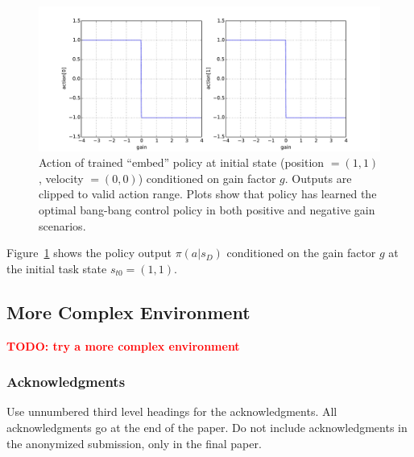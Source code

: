 \documentclass{article}
\newcommand{\TODO}[1]{\textcolor{red}{\textbf{TODO: #1}}}
\begin{document}
\begin{figure}
\centering
\includegraphics[width=\textwidth]{pointmass_conditional_action.pdf}
\caption{
Action of trained ``embed'' policy at initial state (position $ = (1,1)$, velocity $=(0,0)$) conditioned on gain factor $g$.
Outputs are clipped to valid action range.
Plots show that policy has learned the optimal bang-bang control policy in both positive and negative gain scenarios.
}
\label{fig:conditional_action}
\end{figure}

Figure~\ref{fig:conditional_action} shows the policy output $\pi(a|s_D)$ conditioned on
the gain factor $g$ at the initial task state $s_{t0} = (1, 1)$.

\subsection{More Complex Environment}
\TODO{try a more complex environment}


\subsubsection*{Acknowledgments}

Use unnumbered third level headings for the acknowledgments. All
acknowledgments go at the end of the paper. Do not include
acknowledgments in the anonymized submission, only in the final paper.

\small

{}

\end{document}
